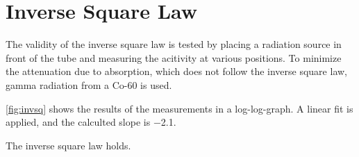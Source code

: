 \section{Inverse Square Law}
The validity of the inverse square law is tested by placing a radiation source in front of the tube and measuring the acitivity at various positions.
To minimize the attenuation due to absorption, which does not follow the inverse square law, gamma radiation from a Co-60 is used.

\autoref{fig:invsq} shows the results of the measurements in a log-log-graph.
A linear fit is applied, and the calculted slope is \num{-2.1}.

The inverse square law holds.
